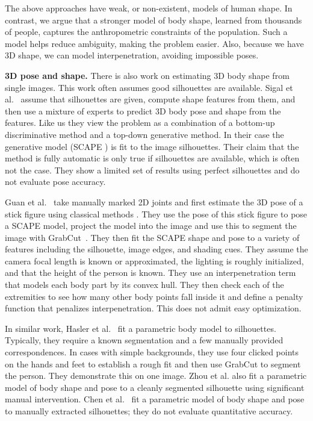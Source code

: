 \documentclass[runningheads]{llncs}
\begin{document}
The above approaches have weak, or non-existent, models of human shape.
In contrast, we argue that a stronger model of body shape, learned from thousands of people, captures the anthropometric constraints of the population.
Such a model helps reduce ambiguity, making the problem easier. 
Also, because we have 3D shape, we can model interpenetration, avoiding impossible poses.

{\bf 3D pose and shape.} 
There is also work on estimating 3D body shape from single images.
This work often assumes good silhouettes are available.
Sigal et al.~\cite{Sigal:2008} assume that silhouettes are given, compute shape features from them, and then use a mixture of experts to predict 3D body pose and shape from the features.
Like us they view the problem as a combination of a bottom-up discriminative method and a top-down generative method.
In their case the generative model (SCAPE \cite{Anguelov:2005}) is fit to the image silhouettes.
Their claim that the method is fully automatic is only true if silhouettes are available, which is often not the case.
They show a limited set of results using perfect silhouettes and do not evaluate pose accuracy.

Guan et al.~\cite{Guan:2009,GuanThesis} take manually marked 2D joints
and first estimate the 3D pose of a stick figure using classical
methods \cite{Lee1985,Taylor:2000}.
They use the pose of this stick figure to pose a SCAPE model, project the model into the image and use this to segment the image with GrabCut~\cite{grabcut}.
They then fit the SCAPE shape and pose to a variety of features including the silhouette, image edges, and shading cues.  
They assume the camera focal length is known or approximated, the lighting is roughly initialized,  and that the height of the person is known.
They use an interpenetration term that models each body part by its convex hull. 
They then check each of the extremities to see how many other body
points fall inside it and define a penalty function that penalizes interpenetration. 
This does not admit easy optimization.  

In similar work, Hasler et al.~\cite{Hasler:2010} fit a parametric body model to silhouettes.  
Typically, they require a known segmentation and a few manually provided correspondences.
In cases with simple backgrounds, they use four clicked points on the hands and feet to establish a rough fit and then use GrabCut to segment the person.
They demonstrate this on one image.
Zhou et al. \cite{Zhou:2010} also fit a parametric model of body shape
and pose to a cleanly segmented silhouette using significant manual intervention.
Chen et al.~\cite{Chen:ECCV:2010} fit a parametric model of body shape and
pose to manually extracted silhouettes; they do not evaluate
quantitative accuracy.
\end{document}
